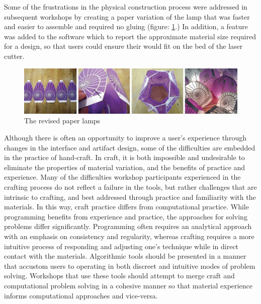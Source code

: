 Some of the frustrations in the physical construction process were addressed in subsequent workshops by creating a paper variation of the lamp that was faster and easier to assemble and required no gluing (figure: \ref{fig:paper_lamp}.) In addition, a feature was added to the software which to report the approximate material size required for a design, so that users could ensure their would fit on the bed of the laser cutter. 
\begin{center}
\begin{figure}[h!]
\includegraphics[width=6.5in]{images/paper_lamps.png}
\caption{The revised paper lamps}
\label{fig:paper_lamp}
\end{figure}
\end{center}
Although there is often an opportunity to improve a user's experience through changes in the interface and artifact design, some of the difficulties are embedded in the practice of hand-craft. In craft, it is both impossible and undesirable to eliminate the properties of material variation, and the benefits of practice and experience. Many of the difficulties workshop participants experienced in the crafting process do not reflect a failure in the tools, but rather challenges that are intrinsic to crafting, and best addressed through practice and familiarity with the materials. In this way, craft practice differs from computational practice. While programming benefits from experience and practice, the approaches for solving problems differ significantly. Programming often requires an analytical approach with an emphasis on consistency and regularity, whereas crafting requires a more intuitive process of responding and adjusting one's technique while in direct contact with the materials. Algorithmic tools should be presented in a manner that accustom users to operating in both discreet and intuitive modes of problem solving. Workshops that use these tools should attempt to merge craft and computational problem solving in a cohesive manner so that material experience informs computational approaches and vice-versa. 

